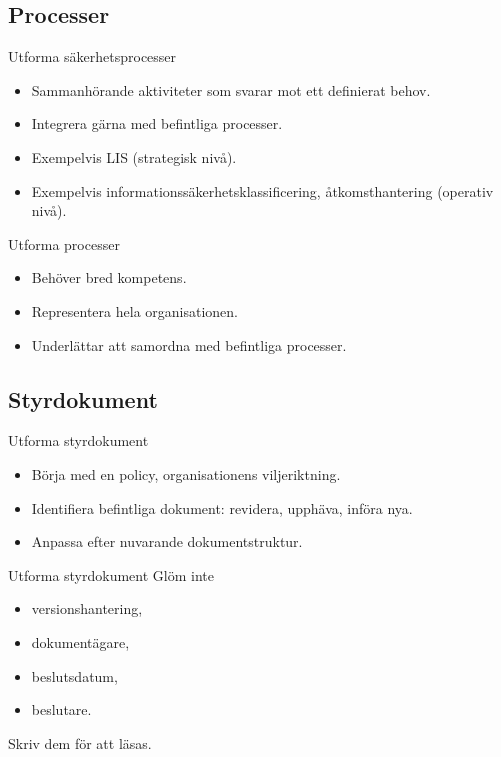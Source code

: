 \documentclass{beamer}
\begin{document}
\subsection{Processer}
\begin{frame}{Utforma säkerhetsprocesser}
  \begin{itemize}
    \item Sammanhörande aktiviteter som svarar mot ett definierat behov.
    \item Integrera gärna med befintliga processer.
    \item Exempelvis LIS (strategisk nivå).
    \item Exempelvis informationssäkerhetsklassificering, åtkomsthantering 
      (operativ nivå).
  \end{itemize}
\end{frame}
\begin{frame}{Utforma processer}
  \begin{itemize}
    \item Behöver bred kompetens.
    \item Representera hela organisationen.
    \item Underlättar att samordna med befintliga processer.
  \end{itemize}
\end{frame}

\subsection{Styrdokument}
\begin{frame}{Utforma styrdokument}
  \begin{itemize}
    \item Börja med en policy, organisationens viljeriktning.
    \item Identifiera befintliga dokument: revidera, upphäva, införa nya.
    \item Anpassa efter nuvarande dokumentstruktur.
  \end{itemize}
\end{frame}
\begin{frame}{Utforma styrdokument}
  Glöm inte
  \begin{itemize}
    \item versionshantering,
    \item dokumentägare,
    \item beslutsdatum,
    \item beslutare.
  \end{itemize}
  Skriv dem för att läsas.
\end{frame}
\end{document}
